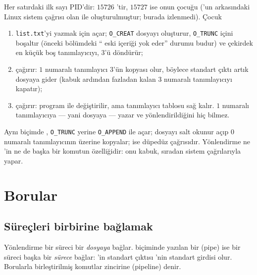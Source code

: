 

Her satırdaki ilk sayı PID'dir: $15726$ 'tir, $15727$ ise onun çocuğu ('un arkasındaki Linux sistem çağrısı olan  ile oluşturulmuştur; burada izlenmedi). Çocuk
\begin{enumerate}[leftmargin=1.4em]
  \item \texttt{list.txt}'yi yazmak için açar; \texttt{O\_CREAT} dosyayı oluşturur, \texttt{O\_TRUNC} içini boşaltır (önceki bölümdeki ``\cmd{>} eski içeriği yok eder'' durumu budur) ve çekirdek en küçük boş tanımlayıcıyı, $3$'ü döndürür;
  \item {} çağırır: $1$ numaralı tanımlayıcı $3$'ün kopyası olur, böylece standart çıktı artık dosyaya gider (kabuk ardından fazladan kalan $3$ numaralı tanımlayıcıyı kapatır);
  \item {} çağırır: program  ile değiştirilir, ama tanımlayıcı tablosu sağ kalır.  $1$ numaralı tanımlayıcıya --- yani dosyaya --- yazar ve yönlendirildiğini hiç bilmez.
\end{enumerate}
Aynı biçimde \cmd{>>}, \texttt{O\_TRUNC} yerine \texttt{O\_APPEND} ile açar; \cmd{<} dosyayı salt okunur açıp $0$ numaralı tanımlayıcının üzerine kopyalar;  ise düpedüz  çağrısıdır. Yönlendirme ne 'in ne de başka bir komutun özelliğidir: onu kabuk, sıradan sistem çağrılarıyla yapar.

\section{Borular}
\label{sec:pipes}

\subsection{Süreçleri birbirine bağlamak}

Yönlendirme bir süreci bir \emph{dosyaya} bağlar.  biçiminde yazılan bir  (pipe) ise bir süreci başka bir \emph{sürece} bağlar: 'in standart çıktısı 'nin standart girdisi olur. Borularla birleştirilmiş komutlar zincirine  (pipeline) denir.


